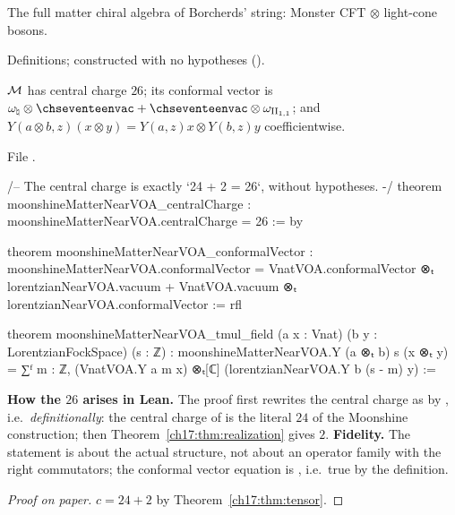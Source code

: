 \begin{physics}
The full matter chiral algebra of Borcherds' string: Monster CFT $\otimes$ light-cone bosons.
\end{physics}

\begin{status}
Definitions; constructed with no hypotheses ().
\end{status}

\begin{theorem}\label{ch17:thm:c26}
$\mathcal{M}$ has central charge $26$; its conformal vector is $\omega_\natural\otimes\chseventeenvac+\chseventeenvac\otimes\omega_{\chseventeenII}$;
and $Y(a\otimes b,z)(x\otimes y)=Y(a,z)x\otimes Y(b,z)y$ coefficientwise.
\end{theorem}

\noindent File .
\begin{leancode}
/-- The central charge is exactly `24 + 2 = 26`, without hypotheses. -/
theorem moonshineMatterNearVOA_centralCharge : moonshineMatterNearVOA.centralCharge = 26 := by

theorem moonshineMatterNearVOA_conformalVector :
    moonshineMatterNearVOA.conformalVector =
      VnatVOA.conformalVector ⊗ₜ lorentzianNearVOA.vacuum +
        VnatVOA.vacuum ⊗ₜ lorentzianNearVOA.conformalVector := rfl

theorem moonshineMatterNearVOA_tmul_field (a x : Vnat) (b y : LorentzianFockSpace) (s : ℤ) :
    moonshineMatterNearVOA.Y (a ⊗ₜ b) s (x ⊗ₜ y) =
      ∑ᶠ m : ℤ, (VnatVOA.Y a m x) ⊗ₜ[ℂ] (lorentzianNearVOA.Y b (s - m) y) :=
\end{leancode}

\begin{dictionary}
\textbf{How the $26$ arises in Lean.} The proof first rewrites the central charge as  by , i.e.\ \emph{definitionally}: the central charge of
 is the literal $24$ of the Moonshine construction; then Theorem~\ref{ch17:thm:realization} gives $2$.
\textbf{Fidelity.} The statement is about the actual structure, not about an operator family with the right
commutators; the conformal vector equation is , i.e.\ true by the definition.
\end{dictionary}

\begin{proof}[Proof on paper]
$c=24+2$ by Theorem~\ref{ch17:thm:tensor}.
\end{proof}

